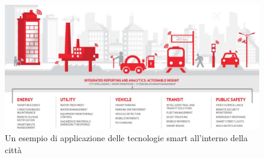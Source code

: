 \begin{figure}[H]
\centering
\includegraphics[scale=1.00]{immagini/Smart-City.jpg}
\caption{Un esempio di applicazione delle tecnologie smart all'interno della città}
\end{figure}

